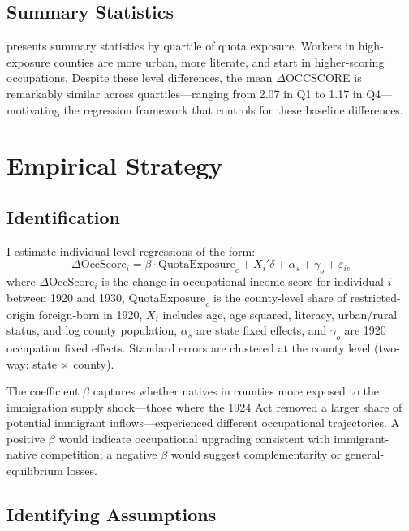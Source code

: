 \documentclass[12pt]{article}
\begin{document}
\subsection{Summary Statistics}



 presents summary statistics by quartile of quota exposure.  Workers in high-exposure counties are more urban, more literate, and start in higher-scoring occupations.  Despite these level differences, the mean $\Delta$OCCSCORE is remarkably similar across quartiles---ranging from 2.07 in Q1 to 1.17 in Q4---motivating the regression framework that controls for these baseline differences.

\section{Empirical Strategy}
\label{sec:strategy}

\subsection{Identification}

I estimate individual-level regressions of the form:
\begin{equation}
\Delta\text{OccScore}_i = \beta \cdot \text{QuotaExposure}_c + X_i'\delta + \alpha_s + \gamma_o + \varepsilon_{ic}
\label{eq:main}
\end{equation}
where $\Delta\text{OccScore}_i$ is the change in occupational income score for individual $i$ between 1920 and 1930, $\text{QuotaExposure}_c$ is the county-level share of restricted-origin foreign-born in 1920, $X_i$ includes age, age squared, literacy, urban/rural status, and log county population, $\alpha_s$ are state fixed effects, and $\gamma_o$ are 1920 occupation fixed effects.  Standard errors are clustered at the county level (two-way: state $\times$ county).

The coefficient $\beta$ captures whether natives in counties more exposed to the immigration supply shock---those where the 1924 Act removed a larger share of potential immigrant inflows---experienced different occupational trajectories.  A positive $\beta$ would indicate occupational upgrading consistent with immigrant-native competition; a negative $\beta$ would suggest complementarity or general-equilibrium losses.

\subsection{Identifying Assumptions}
\end{document}
